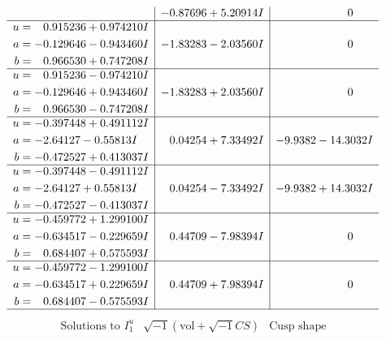 \documentclass[1p]{elsarticle_modified}
\theoremstyle{definition}
\newcommand{\I}{\sqrt{-1}}
\begin{document}
$$\begin{array}{c|c|c}
 & -0.87696 + 5.20914 I & \phantom{-0.000000 } 0 \\ \hline\begin{aligned}
u &= \phantom{-}0.915236 + 0.974210 I \\
a &= -0.129646 - 0.943460 I \\
b &= \phantom{-}0.966530 + 0.747208 I\end{aligned}
 & -1.83283 - 2.03560 I & \phantom{-0.000000 } 0 \\ \hline\begin{aligned}
u &= \phantom{-}0.915236 - 0.974210 I \\
a &= -0.129646 + 0.943460 I \\
b &= \phantom{-}0.966530 - 0.747208 I\end{aligned}
 & -1.83283 + 2.03560 I & \phantom{-0.000000 } 0 \\ \hline\begin{aligned}
u &= -0.397448 + 0.491112 I \\
a &= -2.64127 - 0.55813 I \\
b &= -0.472527 + 0.413037 I\end{aligned}
 & \phantom{-}0.04254 + 7.33492 I & -9.9382 - 14.3032 I \\ \hline\begin{aligned}
u &= -0.397448 - 0.491112 I \\
a &= -2.64127 + 0.55813 I \\
b &= -0.472527 - 0.413037 I\end{aligned}
 & \phantom{-}0.04254 - 7.33492 I & -9.9382 + 14.3032 I \\ \hline\begin{aligned}
u &= -0.459772 + 1.299100 I \\
a &= -0.634517 - 0.229659 I \\
b &= \phantom{-}0.684407 + 0.575593 I\end{aligned}
 & \phantom{-}0.44709 - 7.98394 I & \phantom{-0.000000 } 0 \\ \hline\begin{aligned}
u &= -0.459772 - 1.299100 I \\
a &= -0.634517 + 0.229659 I \\
b &= \phantom{-}0.684407 - 0.575593 I\end{aligned}
 & \phantom{-}0.44709 + 7.98394 I & \phantom{-0.000000 } 0\\
 \hline 
 \end{array}$$\newpage$$\begin{array}{c|c|c}  
\text{Solutions to }I^u_{1}& \I (\text{vol} + \sqrt{-1}CS) & \text{Cusp shape}\\

\end{array}$$
\end{document}
